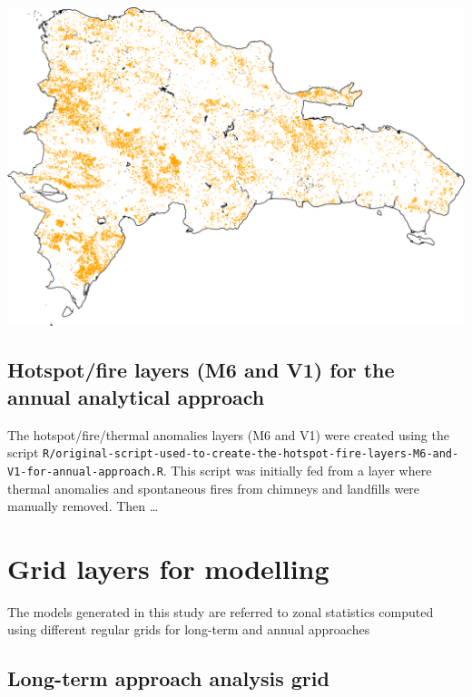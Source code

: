 \documentclass[10pt,landscape,a3paper]{article}
\begin{document}
\begin{center}\includegraphics{img/fires-m6-v1-sel2-2} \end{center}

\hypertarget{hotspotfire-layers-m6-and-v1-for-the-annual-analytical-approach}{%
\subsection{Hotspot/fire layers (M6 and V1) for the annual analytical
approach}\label{hotspotfire-layers-m6-and-v1-for-the-annual-analytical-approach}}

The hotspot/fire/thermal anomalies layers (M6 and V1) were created using
the script
\texttt{R/original-script-used-to-create-the-hotspot-fire-layers-M6-and-V1-for-annual-approach.R}.
This script was initially fed from a layer where thermal anomalies and
spontaneous fires from chimneys and landfills were manually removed.
Then \ldots{}

\hypertarget{grid-layers-for-modelling}{%
\section{Grid layers for modelling}\label{grid-layers-for-modelling}}

The models generated in this study are referred to zonal statistics
computed using different regular grids for long-term and annual
approaches

\hypertarget{long-term-approach-analysis-grid}{%
\subsection{Long-term approach analysis
grid}\label{long-term-approach-analysis-grid}}
\end{document}
